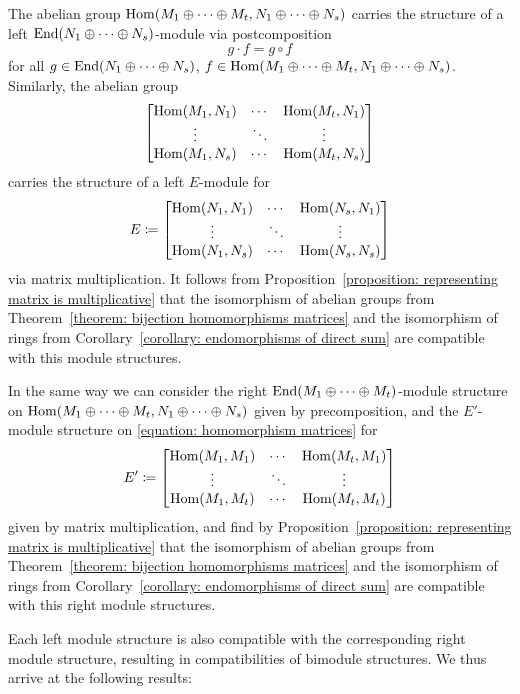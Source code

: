 \begin{fluff}
  The abelian group $\operatorname{Hom}(M_1 \oplus \dotsb \oplus M_t, N_1 \oplus \dotsb \oplus N_s)$ carries the structure of a left $\operatorname{End}(N_1 \oplus \dotsb \oplus N_s)$-module via postcomposition
  \[
      g \cdot f
    = g \circ f
  \]
  for all $g \in \operatorname{End}(N_1 \oplus \dotsb \oplus N_s)$, $f \in \operatorname{Hom}(M_1 \oplus \dotsb \oplus M_t, N_1 \oplus \dotsb \oplus N_s)$.
  Similarly, the abelian group
  \begin{equation}
    \label{equation: homomorphism matrices}
    \begin{bmatrix}
      \operatorname{Hom}(M_1, N_1)  & \cdots  & \operatorname{Hom}(M_t, N_1)  \\
      \vdots          & \ddots  & \vdots          \\
      \operatorname{Hom}(M_1, N_s)  & \cdots  & \operatorname{Hom}(M_t, N_s)
    \end{bmatrix}
  \end{equation}
  carries the structure of a left $E$-module for
  \[
              E
    \coloneqq  \begin{bmatrix}
                \operatorname{Hom}(N_1, N_1)  & \cdots  & \operatorname{Hom}(N_s, N_1)  \\
                \vdots          & \ddots  & \vdots          \\
                \operatorname{Hom}(N_1, N_s)  & \cdots  & \operatorname{Hom}(N_s, N_s)
              \end{bmatrix}
  \]
  via  matrix multiplication.
  It follows from Proposition~\ref{proposition: representing matrix is multiplicative} that the isomorphism of abelian groups from Theorem~\ref{theorem: bijection homomorphisms matrices} and the isomorphism of rings from Corollary~\ref{corollary: endomorphisms of direct sum} are compatible with this module structures.
  
  In the same way we can consider the right $\operatorname{End}(M_1 \oplus \dotsb \oplus M_t)$-module structure on $\operatorname{Hom}(M_1 \oplus \dotsb \oplus M_t, N_1 \oplus \dotsb \oplus N_s)$ given by precomposition, and the $E'$-module structure on \eqref{equation: homomorphism matrices} for
  \[
              E'
    \coloneqq  \begin{bmatrix}
                \operatorname{Hom}(M_1, M_1)  & \cdots  & \operatorname{Hom}(M_t, M_1)  \\
                \vdots          & \ddots  & \vdots          \\
                \operatorname{Hom}(M_1, M_t)  & \cdots  & \operatorname{Hom}(M_t, M_t)
              \end{bmatrix}
  \]
  given by matrix multiplication, and find by Proposition~\ref{proposition: representing matrix is multiplicative} that the isomorphism of abelian groups from Theorem~\ref{theorem: bijection homomorphisms matrices} and the isomorphism of rings from Corollary~\ref{corollary: endomorphisms of direct sum} are compatible with this right module structures.
  
  Each left module structure is also compatible with the corresponding right module structure, resulting in compatibilities of bimodule structures.
  We thus arrive at the following results:
\end{fluff}


